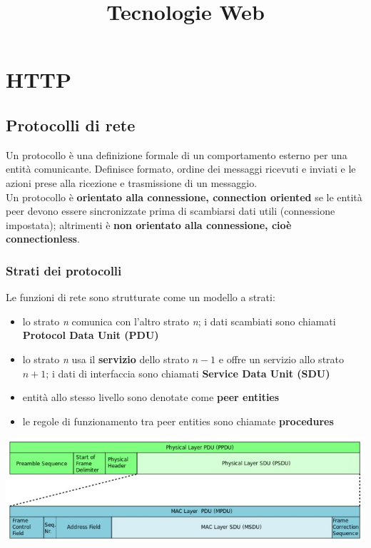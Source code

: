 \title{Tecnologie Web}
\maketitle

\chapter{HTTP}
\section{Protocolli di rete}
Un protocollo è una definizione formale di un comportamento esterno per una entità comunicante. Definisce formato, ordine dei messaggi ricevuti e inviati e le azioni prese alla ricezione e trasmissione di un messaggio. \\

Un protocollo è \textbf{orientato alla connessione, connection oriented} se le entità peer devono essere sincronizzate prima di scambiarsi dati utili (connessione impostata); altrimenti è \textbf{non orientato alla connessione, cioè connectionless}.

\subsection{Strati dei protocolli}
Le funzioni di rete sono strutturate come un modello a strati:
\begin{itemize}
    \item lo strato \emph{n} comunica con l'altro strato \emph{n}; i dati scambiati sono chiamati \textbf{Protocol Data Unit (PDU)}
    \item lo strato \emph{n} usa il \textbf{servizio} dello strato $n - 1$ e offre un servizio allo strato $n + 1$; i dati di interfaccia sono chiamati \textbf{Service Data Unit (SDU)}
    \item entità allo stesso livello sono denotate come \textbf{peer entities}
    \item le regole di funzionamento tra peer entities sono chiamate \textbf{procedures}
\end{itemize}

\begin{center}
\includegraphics[scale=0.4]{Images/TecnologieWeb/1/4.jpg}    
\end{center}

